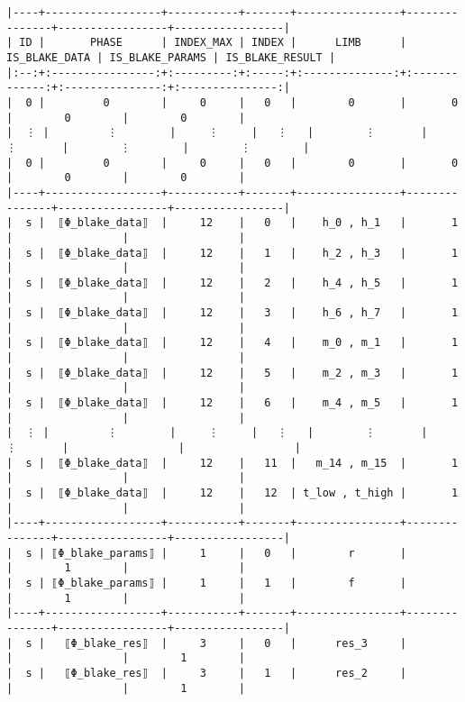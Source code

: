 \documentclass[varwidth=\maxdimen,margin=0.5cm,multi={verbatim}]{standalone}
\begin{document}
\begin{verbatim}
|----+------------------+-----------+-------+----------------+---------------+-----------------+-----------------|
| ID |       PHASE      | INDEX_MAX | INDEX |      LIMB      | IS_BLAKE_DATA | IS_BLAKE_PARAMS | IS_BLAKE_RESULT |
|:--:+:----------------:+:---------:+:-----:+:--------------:+:-------------:+:---------------:+:---------------:|
|  0 |         0        |     0     |   0   |        0       |       0       |        0        |        0        |
|  ⋮ |         ⋮        |     ⋮     |   ⋮   |        ⋮       |       ⋮       |        ⋮        |        ⋮        |
|  0 |         0        |     0     |   0   |        0       |       0       |        0        |        0        |
|----+------------------+-----------+-------+----------------+---------------+-----------------+-----------------|
|  s |  ⟦Φ_blake_data⟧  |     12    |   0   |    h_0 , h_1   |       1       |                 |                 |
|  s |  ⟦Φ_blake_data⟧  |     12    |   1   |    h_2 , h_3   |       1       |                 |                 |
|  s |  ⟦Φ_blake_data⟧  |     12    |   2   |    h_4 , h_5   |       1       |                 |                 |
|  s |  ⟦Φ_blake_data⟧  |     12    |   3   |    h_6 , h_7   |       1       |                 |                 |
|  s |  ⟦Φ_blake_data⟧  |     12    |   4   |    m_0 , m_1   |       1       |                 |                 |
|  s |  ⟦Φ_blake_data⟧  |     12    |   5   |    m_2 , m_3   |       1       |                 |                 |
|  s |  ⟦Φ_blake_data⟧  |     12    |   6   |    m_4 , m_5   |       1       |                 |                 |
|  ⋮ |         ⋮        |     ⋮     |   ⋮   |        ⋮       |       ⋮       |                 |                 |
|  s |  ⟦Φ_blake_data⟧  |     12    |   11  |   m_14 , m_15  |       1       |                 |                 |
|  s |  ⟦Φ_blake_data⟧  |     12    |   12  | t_low , t_high |       1       |                 |                 |
|----+------------------+-----------+-------+----------------+---------------+-----------------+-----------------|
|  s | ⟦Φ_blake_params⟧ |     1     |   0   |        r       |               |        1        |                 |
|  s | ⟦Φ_blake_params⟧ |     1     |   1   |        f       |               |        1        |                 |
|----+------------------+-----------+-------+----------------+---------------+-----------------+-----------------|
|  s |   ⟦Φ_blake_res⟧  |     3     |   0   |      res_3     |               |                 |        1        |
|  s |   ⟦Φ_blake_res⟧  |     3     |   1   |      res_2     |               |                 |        1        |

\end{verbatim}
\end{document}
